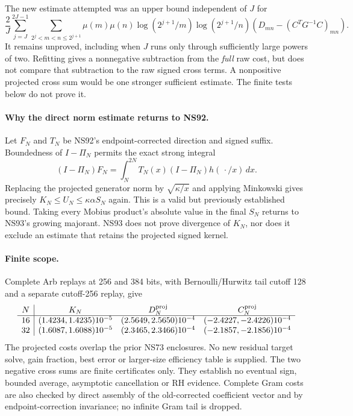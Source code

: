 The new estimate attempted was an upper bound independent of $J$ for
\[
 \frac2J\sum_{j=J}^{2J-1}
 \sum_{2^j<m<n\le2^{j+1}}
 \mu(m)\mu(n)\log(2^{j+1}/m)\log(2^{j+1}/n)
 \left(D_{mn}-(C^TG^{-1}C)_{mn}\right).
\]
It remains unproved, including when $J$ runs only through sufficiently
large powers of two. Refitting gives a nonnegative subtraction from the
\emph{full} raw cost, but does not compare that subtraction to the raw
signed cross terms. A nonpositive projected cross sum would be one
stronger sufficient estimate. The finite tests below do not prove it.

\paragraph{Why the direct norm estimate returns to NS92.}
Let $F_N$ and $T_N$ be NS92's endpoint-corrected direction and signed
suffix. Boundedness of $I-\Pi_N$ permits the exact strong integral
\[
 (I-\Pi_N)F_N
 =\int_N^{2N}T_N(x)(I-\Pi_N)h(\,\cdot/x)\,dx.
\]
Replacing the projected generator norm by $\sqrt{\kappa/x}$ and applying
Minkowski gives precisely $K_N\le U_N\le\kappa\alpha S_N$ again.
This is a valid but previously established bound. Taking every Mobius
product's absolute value in the final $S_N$ returns to NS93's growing
majorant. NS93 does not prove divergence of $K_N$, nor does it exclude
an estimate that retains the projected signed kernel.

\paragraph{Finite scope.}
Complete Arb replays at 256 and 384 bits, with Bernoulli/Hurwitz tail
cutoff 128 and a separate cutoff-256 replay, give
\[
\begin{array}{c|ccc}
N&K_N&D_N^{\rm proj}&C_N^{\rm proj}\\\hline
16&(1.4234,1.4235)10^{-5}&(2.5649,2.5650)10^{-4}&(-2.4227,-2.4226)10^{-4}\\
32&(1.6087,1.6088)10^{-5}&(2.3465,2.3466)10^{-4}&(-2.1857,-2.1856)10^{-4}
\end{array}
\]
The projected costs overlap the prior NS73 enclosures. No new residual
target solve, gain fraction, best error or larger-size efficiency table
is supplied. The two negative cross sums are finite certificates only.
They establish no eventual sign, bounded average, asymptotic cancellation
or RH evidence. Complete Gram costs are also checked by direct assembly
of the old-corrected coefficient vector and by endpoint-correction
invariance; no infinite Gram tail is dropped.

